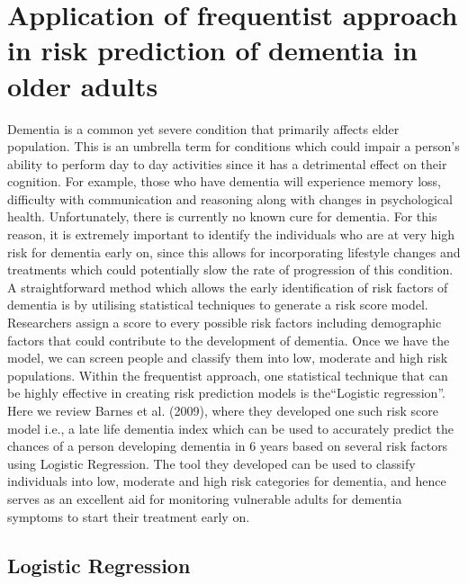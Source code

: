 \documentclass[12pt,letterpaper]{article}
\begin{document}
\section{Application of frequentist approach in risk prediction of dementia in older adults}
Dementia is a common yet severe condition that primarily affects elder population. This is an umbrella term for conditions which could impair a person's ability to perform day to day activities since it has a detrimental effect on their cognition. For example, those who have dementia will experience memory loss, difficulty with communication and reasoning along with changes in psychological health. Unfortunately, there is currently no known cure for dementia. For this reason, it is extremely important to identify the individuals who are at very high risk for dementia early on, since this allows for incorporating lifestyle changes and treatments which could potentially slow the rate of progression of this condition. A straightforward method which allows the early identification of risk factors of dementia is by utilising statistical techniques to generate a risk score model. Researchers assign a score to every possible risk factors including demographic factors that could contribute to the development of dementia. Once we have the model, we can screen people and classify them into low, moderate and high risk populations. Within the frequentist approach, one statistical technique that can be highly effective in creating risk prediction models is the``Logistic regression''. Here we review Barnes et al. (2009), where they developed one such risk score model i.e., a late life dementia index which can be used to accurately predict the chances of a person developing dementia in 6 years based on several risk factors using Logistic Regression. The tool they developed can be used to classify individuals into low, moderate and high risk categories for dementia, and hence serves as an excellent aid for monitoring vulnerable adults for dementia symptoms to start their treatment early on.  

\subsection{Logistic Regression}
\end{document}
